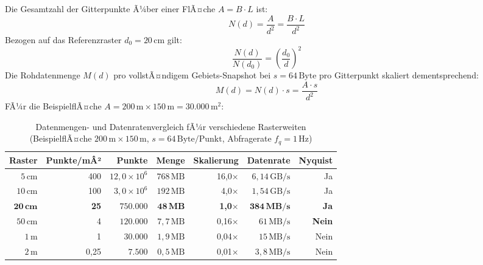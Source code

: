 ﻿\documentclass[a4paper,12pt]{article}
\theoremstyle{definition}
\begin{document}
Die Gesamtzahl der Gitterpunkte Ã¼ber einer FlÃ¤che $A = B \cdot L$ ist:
\begin{equation}
  N(d) = \frac{A}{d^2} = \frac{B \cdot L}{d^2}
  \label{eq:Npunkt}
\end{equation}
Bezogen auf das Referenzraster $d_0 = 20\,\text{cm}$ gilt:
\begin{equation}
  \frac{N(d)}{N(d_0)} = \left(\frac{d_0}{d}\right)^2
  \label{eq:skalierung}
\end{equation}
Die Rohdatenmenge $M(d)$ pro vollstÃ¤ndigem Gebiets-Snapshot bei
$s = 64\,\text{Byte}$ pro Gitterpunkt skaliert dementsprechend:
\begin{equation}
  M(d) = N(d)\cdot s = \frac{A \cdot s}{d^2}
  \label{eq:datenmenge}
\end{equation}
FÃ¼r die BeispielflÃ¤che $A = 200\,\text{m} \times 150\,\text{m} = 30.000\,\text{m}^2$:
\begin{table}[H]
\centering
\caption{Datenmengen- und Datenratenvergleich fÃ¼r verschiedene Rasterweiten
         (BeispielflÃ¤che $200\,\text{m}\times150\,\text{m}$,
          $s = 64\,\text{Byte/Punkt}$, Abfragerate $f_q = 1\,\text{Hz}$)}
\label{tab:rastervergleich}
\renewcommand{\arraystretch}{1.45}
\begin{tabular}{@{}r r r r r r r@{}}
\toprule
\textbf{Raster} & \textbf{Punkte/mÂ²} & \textbf{Punkte}
  & \textbf{Menge} & \textbf{Skalierung} & \textbf{Datenrate}
  & \textbf{Nyquist} \\
\midrule
$5\,\text{cm}$  & 400   & $12{,}0\times10^6$ & $768\,\text{MB}$ & 16{,}0$\times$  & $6{,}14\,\text{GB/s}$ & Ja \\
$10\,\text{cm}$ & 100   & $3{,}0\times10^6$  & $192\,\text{MB}$ &  4{,}0$\times$  & $1{,}54\,\text{GB/s}$ & Ja \\
$\mathbf{20\,\text{cm}}$ & \textbf{25} & $\mathbf{750.000}$ & $\mathbf{48\,\text{MB}}$ & \textbf{1,0$\times$} & $\mathbf{384\,\text{MB/s}}$ & \textbf{Ja} \\
$50\,\text{cm}$ & 4     & $120.000$          & $7{,}7\,\text{MB}$ &  0{,}16$\times$ & $61\,\text{MB/s}$ & \textbf{Nein} \\
$1\,\text{m}$   & 1     & $30.000$           & $1{,}9\,\text{MB}$ &  0{,}04$\times$ & $15\,\text{MB/s}$ & Nein \\
$2\,\text{m}$   & 0{,}25 & $7.500$           & $0{,}5\,\text{MB}$ &  0{,}01$\times$ & $3{,}8\,\text{MB/s}$ & Nein \\
\bottomrule
\end{tabular}
\end{table}
\end{document}
